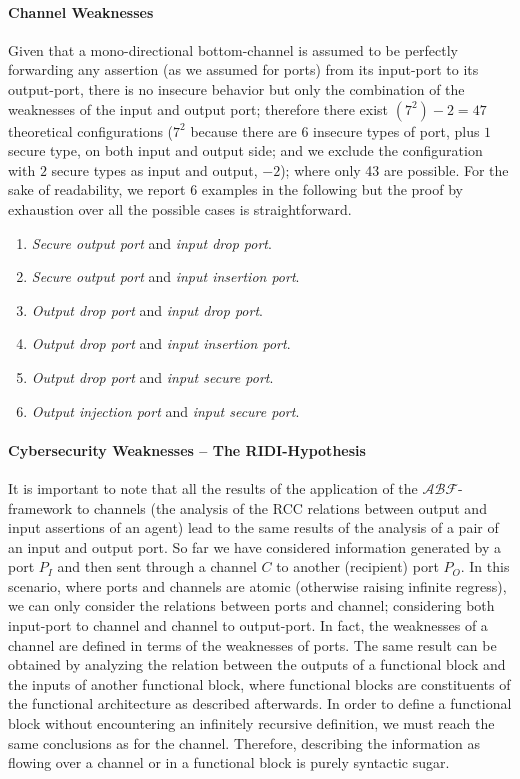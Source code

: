 \documentclass[conference]{IEEEtran}
\newcommand{\assertionRegion}{\mathcal{A}}
\newcommand{\beliefRegion}{\mathcal{B}}
\newcommand{\factRegion}{\mathcal{F}}
\newcommand{\abftheory}{\assertionRegion\beliefRegion\factRegion}
\newcommand{\Rcc}[2]{rcc(#1,#2)}
\begin{document}
\paragraph{Channel Weaknesses}
Given that a mono-directional bottom-channel is assumed to be perfectly
forwarding any assertion (as we assumed for ports) from its input-port to its
output-port, there is no insecure behavior but only the combination of the
weaknesses of the input and output port; therefore there exist $(7^2)-2=47$
theoretical configurations ($7^2$ because there are $6$ insecure types of port,
plus $1$ secure type, on both input and output side; and we exclude the
configuration with $2$ secure types as input and output, $-2$); where only 43
are possible. For the sake of readability, we report 6 examples in the
following but the proof by exhaustion over all the possible cases is
straightforward.

\begin{enumerate}[start=6, label={W\arabic*)}]
	\item \emph{Secure output port} and \emph{input drop port}.
	\item \emph{Secure output port} and \emph{input insertion port}.
	\item \emph{Output drop port} and \emph{input drop port}.
	\item \emph{Output drop port} and \emph{input insertion port}.
	\item \emph{Output drop port} and \emph{input secure port}.
	\item \emph{Output injection port} and \emph{input secure port}.
\end{enumerate}

\paragraph{Cybersecurity Weaknesses -- The RIDI-Hypothesis} 
It is important to note that all the results of the application of the
$\abftheory$-framework to channels (the analysis of the RCC relations
between output and input assertions of an agent)
lead to the same results of the
analysis of a pair of an input and output port.
So far we have
considered information generated by a port $P_I$ and then sent through a
channel $C$ to another (recipient) port $P_O$. In this scenario, where ports and
channels are atomic (otherwise raising infinite regress), we can only
consider the relations between ports and channel; considering both input-port
to channel and channel to output-port.  In fact, the weaknesses of a channel
are defined in terms of the weaknesses of ports.  
The same result can be obtained by analyzing the relation between the outputs
of a functional block and the inputs of another functional block, where
functional blocks are constituents of the functional architecture as described
afterwards.  In order to define a functional block without encountering an
infinitely recursive definition, we must reach the same conclusions as for the
channel. Therefore, describing the information as flowing over a channel or in
a functional block is purely syntactic sugar.
\end{document}
